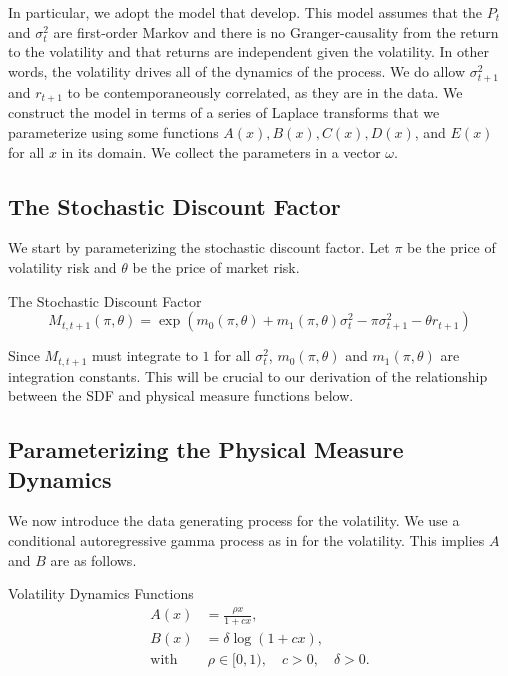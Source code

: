 \documentclass[11pt, letterpaper, twoside]{article}
\begin{document}
In particular, we adopt the model that \textcite{han2018leverage} develop. This model assumes that the $P_t$ and $\sigma^2_t$ are first-order Markov and there is no Granger-causality from the return to the volatility and that returns are independent given the volatility. In other words, the volatility drives all of the dynamics of the process. We do allow $\sigma^2_{t+1}$ and $r_{t+1}$ to be contemporaneously correlated, as they are in the data. We construct the model in terms of a series of Laplace transforms that we parameterize using some functions $A(x), B(x), C(x), D(x)$, and $E(x)$ for all $x$ in its domain. We collect the parameters in a vector $\omega$.

\subsection{The Stochastic Discount Factor}\label{sec:deriving_sdf_functions}

We start by parameterizing the stochastic discount factor.  Let $\pi$ be the price of volatility risk and $\theta$ be the price of market risk.

\begin{defn}{The Stochastic Discount Factor}
 \label{defn:SDF}
 \begin{equation}
  M_{t,t+1}(\pi, \theta) = \exp\left(m_{0}(\pi, \theta) + m_1(\pi, \theta) \sigma_t^2 - \pi \sigma^2_{t+1} -
  \theta r_{t+1}\right) 
 \end{equation}
\end{defn}

Since $M_{t,t+1}$ must integrate to $1$ for all $\sigma^2_t$, $m_{0}(\pi, \theta)$ and $m_1(\pi, \theta)$ are integration constants. This will be crucial to our derivation of the relationship between the SDF and physical measure functions below.

\subsection{Parameterizing the Physical Measure Dynamics}

We now introduce the data generating process for the volatility. We use a conditional autoregressive gamma process as in \textcite{gourieroux2006autoregressive, han2018leverage} for the volatility. This implies $A$ and $B$ are as follows.

\begin{defn}{Volatility Dynamics Functions}
 \label{defn:physical_vol_dynamics}
 \begin{align}
  \label{defn:a_PP}
  A(x) &= \frac{\rho x}{1 + c x}, \\
  \label{defn:b_PP}
  B(x) &= \delta \log(1 + c x),\\
% 
  \text{with}&\ \rho \in [0,1), \quad c > 0, \quad \delta > 0. \nonumber
 \end{align}

\end{defn}
\end{document}
